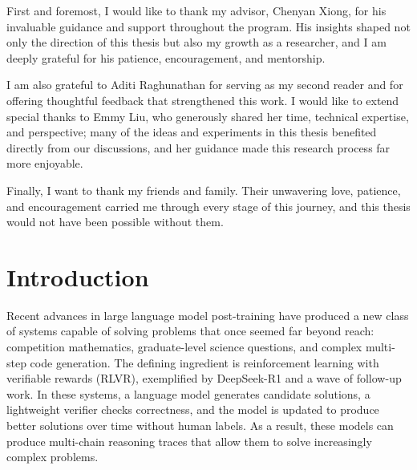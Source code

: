 \documentclass[12pt]{cmuthesis}
\begin{document}
\begin{acknowledgments}
First and foremost, I would like to thank my advisor, Chenyan Xiong, for his invaluable guidance and support throughout the program. His insights shaped not only the direction of this thesis but also my growth as a researcher, and I am deeply grateful for his patience, encouragement, and mentorship.

I am also grateful to Aditi Raghunathan for serving as my second reader and for offering thoughtful feedback that strengthened this work. I would like to extend special thanks to Emmy Liu, who generously shared her time, technical expertise, and perspective; many of the ideas and experiments in this thesis benefited directly from our discussions, and her guidance made this research process far more enjoyable.

Finally, I want to thank my friends and family. Their unwavering love, patience, and encouragement carried me through every stage of this journey, and this thesis would not have been possible without them.
\end{acknowledgments}



\tableofcontents
\listoffigures
\listoftables

\mainmatter


%
%
%
%
%


\chapter{Introduction}
Recent advances in large language model post-training have produced a new class of systems capable of solving problems that once seemed far beyond reach: competition mathematics, graduate-level science questions, and complex multi-step code generation.
The defining ingredient is reinforcement learning with verifiable rewards (RLVR), exemplified by DeepSeek-R1 \citep{deepseek-aiDeepSeekR1IncentivizingReasoning2025} and a wave of follow-up work.
In these systems, a language model generates candidate solutions, a lightweight verifier checks correctness, and the model is updated to produce better solutions over time without human labels.
As a result, these models can produce multi-chain reasoning traces that allow them to solve increasingly complex problems.
\end{document}
